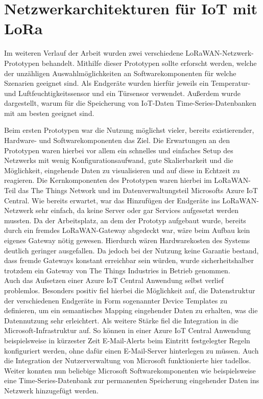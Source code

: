 \section{Netzwerkarchitekturen für IoT mit LoRa}

Im weiteren Verlauf der Arbeit wurden zwei verschiedene LoRaWAN-Netzwerk-Prototypen behandelt. Mithilfe dieser Prototypen sollte erforscht werden, welche der unzähligen Auswahlmöglichkeiten an Softwarekomponenten für welche Szenarien geeignet sind. Als Endgeräte wurden hierfür jeweils ein Temperatur- und Luftfeuchtigkeitssensor und ein Türsensor verwendet. Außerdem wurde dargestellt, warum für die Speicherung von IoT-Daten Time-Series-Datenbanken mit am besten geeignet sind. 

Beim ersten Prototypen war die Nutzung möglichst vieler, bereits existierender, Hardware- und Softwarekomponenten das Ziel. Die Erwartungen an den Prototypen waren hierbei vor allem ein schnelles und einfaches Setup des Netzwerks mit wenig Konfigurationsaufwand, gute Skalierbarkeit und die Möglichkeit, eingehende Daten zu visualisieren und auf diese in Echtzeit zu reagieren. Die Kernkomponenten des Prototypen waren hierbei im LoRaWAN-Teil das The Things Network und im Datenverwaltungsteil Microsofts Azure IoT Central. Wie bereits erwartet, war das Hinzufügen der Endgeräte ins LoRaWAN-Netzwerk sehr einfach, da keine Server oder gar Services aufgesetzt werden mussten. Da der Arbeitsplatz, an dem der Prototyp aufgebaut wurde, bereits durch ein fremdes LoRaWAN-Gateway abgedeckt war, wäre beim Aufbau kein eigenes Gateway nötig gewesen. Hierdurch wären Hardwarekosten des Systems deutlich geringer ausgefallen. Da jedoch bei der Nutzung keine Garantie bestand, dass fremde Gateways konstant erreichbar sein würden, wurde sicherheitshalber trotzdem ein Gateway von The Things Industries in Betrieb genommen.\\
Auch das Aufsetzen einer Azure IoT Central Anwendung selbst verlief problemlos. Besonders positiv fiel hierbei die Möglichkeit auf, die Datenstruktur der verschiedenen Endgeräte in Form sogenannter Device Templates zu definieren, um ein semantisches Mapping eingehender Daten zu erhalten, was die Datennutzung sehr erleichtert. Als weitere Stärke fiel die Integration in die Microsoft-Infrastruktur auf. So können in einer Azure IoT Central Anwendung beispielsweise in kürzester Zeit \mbox{E-Mail}-Alerts beim Eintritt festgelegter Regeln konfiguriert werden, ohne dafür einen E-Mail-Server hinterlegen zu müssen. Auch die Integration der Nutzerverwaltung von Microsoft funktionierte hier tadellos. Weiter konnten nun beliebige \mbox{Microsoft} Softwarekomponenten wie beispielsweise eine Time-Series-Datenbank zur permanenten Speicherung eingehender Daten ins Netzwerk hinzugefügt werden.\\
